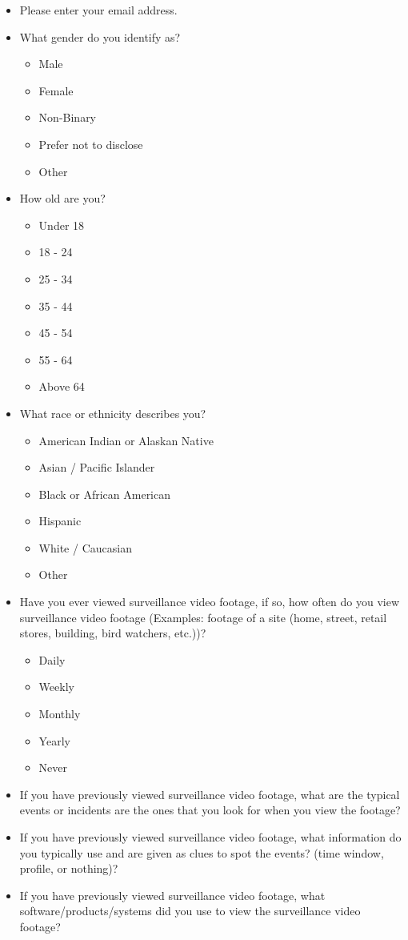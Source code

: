\documentclass[doublespace,draft,nopageskip]{VTthesis} %
\begin{document}
\begin{itemize}
    \item Please enter your email address.
    \item What gender do you identify as?
    \begin{itemize}
        \item Male
        \item Female
        \item Non-Binary
        \item Prefer not to disclose
        \item Other
    \end{itemize}
    \item How old are you?
    \begin{itemize}
        \item Under 18
        \item 18 - 24
        \item 25 - 34
        \item 35 - 44
        \item 45 - 54
        \item 55 - 64
        \item Above 64
    \end{itemize}
    \item What race or ethnicity describes you?
    \begin{itemize}
        \item American Indian or Alaskan Native
        \item Asian / Pacific Islander
        \item Black or African American
        \item Hispanic
        \item White / Caucasian
        \item Other
    \end{itemize}
    \item Have you ever viewed surveillance video footage, if so, how often do you view surveillance video footage (Examples: footage of a site (home, street, retail stores, building, bird watchers, etc.))?
     \begin{itemize}
        \item Daily
        \item Weekly
        \item Monthly
        \item Yearly
        \item Never
    \end{itemize}
    \item If you have previously viewed surveillance video footage, what are the typical events or incidents are the ones that you look for when you view the footage?
    \item If you have previously viewed surveillance video footage, what information do you typically use and are given as clues to spot the events? (time window, profile, or nothing)?
    \item If you have previously viewed surveillance video footage, what software/products/systems did you use to view the surveillance video footage?
\end{itemize}
\end{document}
